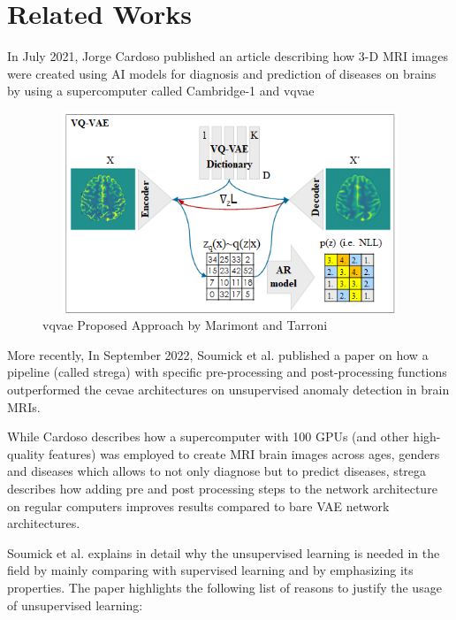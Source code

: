 \section{Related Works}

In July 2021, Jorge Cardoso published an article \cite{jcardoso} describing how 3-D MRI images were created using AI models for diagnosis and prediction of diseases on brains by using a supercomputer called Cambridge-1 and \Acrfull{vqvae}

\begin{figure}[ht]
    \hspace*{-0.8in}
    \centering
    \includegraphics[width = 16cm, height = 6cm]{images/vqvae.png}
    \caption[\Acrshort{vqvae} Proposed Approach by Marimont and Tarroni]{\Acrshort{vqvae} Proposed Approach by Marimont and Tarroni}
    \label{fig:vqvae}
\end{figure}

More recently, In September 2022, Soumick et al. \cite{soumick} published a paper on how a pipeline (called \Acrshort{strega}) with specific pre-processing and post-processing functions outperformed the \Acrfull{cevae} architectures on unsupervised anomaly detection in brain MRIs.

While Cardoso describes how a supercomputer with 100 GPUs (and other high-quality features) was employed to create MRI brain images across ages, genders and diseases which allows to not only diagnose but to predict diseases, \Acrshort{strega} describes how adding pre and post processing steps to the network architecture on regular computers improves results compared to bare VAE network architectures.

Soumick et al. \cite{soumick} explains in detail why the unsupervised learning is needed in the field by mainly comparing with supervised learning and by emphasizing its properties. The paper highlights the following list of reasons to justify the usage of unsupervised learning:


